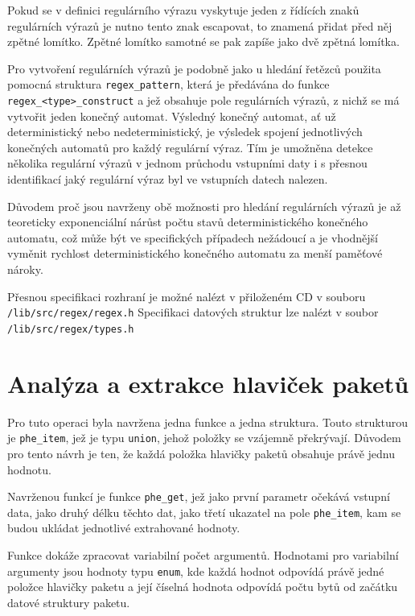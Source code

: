 Pokud se v definici regulárního výrazu vyskytuje jeden z řídících znaků regulárních výrazů
je nutno tento znak escapovat, to znamená přidat před něj zpětné lomítko.
Zpětné lomítko samotné se pak zapíše jako dvě zpětná lomítka.

Pro vytvoření regulárních výrazů je podobně jako u hledání řetězců
použita pomocná struktura \texttt{regex\_pattern}, která je předávána do funkce \texttt{regex\_<type>\_construct}
a jež obsahuje pole regulárních výrazů, z nichž se má vytvořit jeden konečný automat.
Výsledný konečný automat, ať už deterministický nebo nedeterministický, je výsledek spojení jednotlivých
konečných automatů pro každý regulární výraz. Tím je umožněna detekce několika
regulární výrazů v jednom průchodu vstupními daty i s přesnou identifikací jaký regulární
výraz byl ve vstupních datech nalezen.

Důvodem proč jsou navrženy obě možnosti pro hledání regulárních výrazů je až teoreticky exponenciální nárůst
počtu stavů deterministického konečného automatu, což může být ve specifických případech nežádoucí a je vhodnější
vyměnit rychlost deterministického konečného automatu za menší paměťové nároky.

Přesnou specifikaci rozhraní je možné nalézt v přiloženém CD v souboru \texttt{/lib/src/regex/regex.h}
Specifikaci datových struktur lze nalézt v soubor \texttt{/lib/src/regex/types.h}

\section{Analýza a extrakce hlaviček paketů}\label{api:phe} %

Pro tuto operaci byla navržena jedna funkce a jedna struktura.
Touto strukturou je \texttt{phe\_item}, jež je typu \texttt{union}, jehož položky
se vzájemně překrývají. Důvodem pro tento návrh je ten, že každá položka hlavičky paketů obsahuje právě jednu hodnotu.

Navrženou funkcí je funkce \texttt{phe\_get}, jež jako první parametr očekává
vstupní data, jako druhý délku těchto dat, jako třetí ukazatel na pole \texttt{phe\_item},
kam se budou ukládat jednotlivé extrahované hodnoty.

Funkce dokáže zpracovat variabilní počet argumentů.
Hodnotami pro variabilní argumenty jsou hodnoty typu \texttt{enum}, kde každá hodnot odpovídá
právě jedné položce hlavičky paketu a její číselná hodnota odpovídá počtu bytů
od začátku datové struktury paketu.

